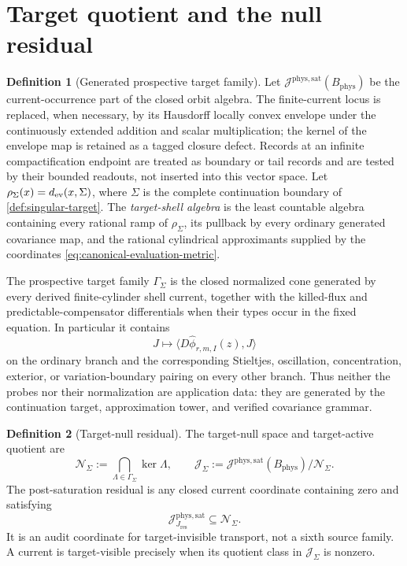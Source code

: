 \documentclass[11pt]{article}
\numberwithin{section}{part}
\theoremstyle{plain}
\theoremstyle{definition}
\newtheorem{definition}[definition]{Definition}
\theoremstyle{remark}
\newcommand{\Res}{J_{\mathrm{res}}}
\newcommand{\Null}{\mathscr N}
\newcommand{\Phys}{\mathrm{phys}}
\newcommand{\Sat}{\mathrm{sat}}
\newcommand{\Budget}{B_{\Phys}}
\begin{document}
\section{Target quotient and the null residual}
\label{sec:target-null-residual}

\begin{definition}[Generated prospective target family]
\label{def:prospective-target-functionals}
Let \(\mathscr J^{\Phys,\Sat}(\Budget)\) be the current-occurrence part of
the closed orbit algebra.  The finite-current locus is replaced, when
necessary, by its Hausdorff locally convex envelope under the continuously
extended addition and scalar multiplication; the kernel of the envelope map
is retained as a tagged closure defect.  Records at an infinite compactification endpoint
are treated as boundary or tail records and are tested by their bounded
readouts, not inserted into this vector space.  Let
\(\rho_\Sigma(x)=d_{\rm ev}(x,\Sigma)\), where \(\Sigma\) is the complete
continuation boundary of \cref{def:singular-target}.  The \emph{target-shell
algebra} is the least countable algebra containing every rational ramp of
\(\rho_\Sigma\), its pullback by every ordinary generated covariance map, and
the rational cylindrical approximants supplied by the coordinates
\eqref{eq:canonical-evaluation-metric}.

The prospective target family \(\Gamma_\Sigma\) is the closed normalized cone
generated by every derived finite-cylinder shell current,
together with the killed-flux and predictable-compensator differentials when
their types occur in the fixed equation.  In particular it contains
\[
 J\longmapsto
 \langle D\widehat\phi_{r,m,I}(z),J\rangle
\]
on the ordinary branch and the corresponding Stieltjes, oscillation,
concentration, exterior, or variation-boundary pairing on every other branch.
Thus neither the probes nor their normalization are application data: they
are generated by the continuation target, approximation tower, and verified
covariance grammar.
\end{definition}

\begin{definition}[Target-null residual]
\label{def:target-null-residual}
The target-null space and target-active quotient are
\begin{equation}
 \label{eq:target-null-space}
 \Null_\Sigma
 :=\bigcap_{\Lambda\in\Gamma_\Sigma}\ker\Lambda,
 \qquad
 \mathscr J_\Sigma
 :=\mathscr J^{\Phys,\Sat}(\Budget)/\Null_\Sigma.
\end{equation}
The post-saturation residual is any closed current coordinate containing zero
and satisfying
\begin{equation}
 \label{eq:residual-is-target-null}
 \mathscr J_{\Res}^{\Phys,\Sat}\subseteq\Null_\Sigma.
\end{equation}
It is an audit coordinate for target-invisible transport, not a sixth source
family.  A current is target-visible precisely when its quotient class in
\(\mathscr J_\Sigma\) is nonzero.
\end{definition}
\end{document}
